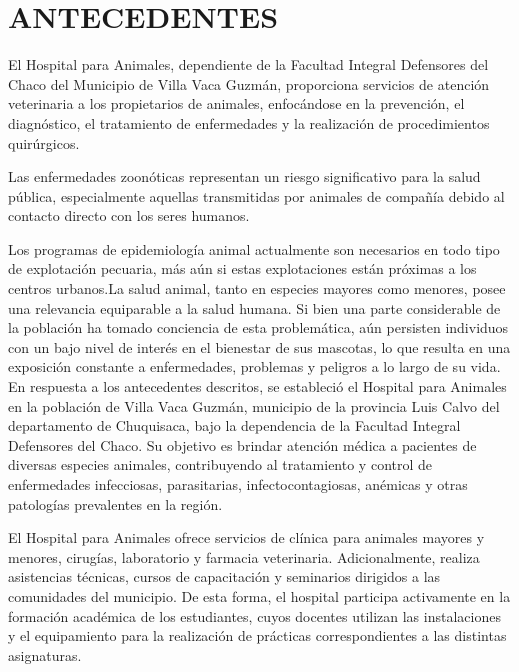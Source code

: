 \clearpage

\renewcommand{\thepage}{\arabic{page}}

\section{ANTECEDENTES}
\label{section:antecedentes}

El Hospital para Animales, dependiente de la Facultad Integral Defensores del Chaco del Municipio de Villa Vaca Guzmán, proporciona servicios de atención veterinaria a los propietarios de animales, enfocándose en la prevención, el diagnóstico, el tratamiento de enfermedades y la realización de procedimientos quirúrgicos.

Las enfermedades zoonóticas representan un riesgo significativo para la salud pública, especialmente aquellas transmitidas por animales de compañía debido al contacto directo con los seres humanos.

Los programas de epidemiología animal actualmente son necesarios en todo tipo de explotación pecuaria, más aún si estas explotaciones están próximas a los centros urbanos.La salud animal, tanto en especies mayores como menores, posee una relevancia equiparable a la salud humana. Si bien una parte considerable de la población ha tomado conciencia de esta problemática, aún persisten individuos con un bajo nivel de interés en el bienestar de sus mascotas, lo que resulta en una exposición constante a enfermedades, problemas y peligros a lo largo de su vida. En respuesta a los antecedentes descritos, se estableció el Hospital para Animales en la población de Villa Vaca Guzmán, municipio de la provincia Luis Calvo del departamento de Chuquisaca, bajo la dependencia de la Facultad Integral Defensores del Chaco. Su objetivo es brindar atención médica a pacientes de diversas especies animales, contribuyendo al tratamiento y control de enfermedades infecciosas, parasitarias, infectocontagiosas, anémicas y otras patologías prevalentes en la región.

El Hospital para Animales ofrece servicios de clínica para animales mayores y menores, cirugías, laboratorio y farmacia veterinaria. Adicionalmente, realiza asistencias técnicas, cursos de capacitación y seminarios dirigidos a las comunidades del municipio. De esta forma, el hospital participa activamente en la formación académica de los estudiantes, cuyos docentes utilizan las instalaciones y el equipamiento para la realización de prácticas correspondientes a las distintas asignaturas.
